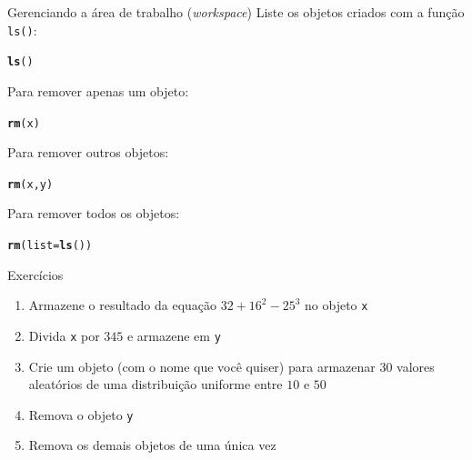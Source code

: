 \documentclass[10pt,handout]{beamer}\usepackage[]{graphicx}\usepackage[]{color}
\makeatletter
\newcommand{\hlstd}[1]{\textcolor[rgb]{0.345,0.345,0.345}{#1}}%
\newcommand{\hlkwc}[1]{\textcolor[rgb]{0.333,0.667,0.333}{#1}}%
\newcommand{\hlkwd}[1]{\textcolor[rgb]{0.282,0.239,0.545}{\textbf{#1}}}%
\newenvironment{kframe}{%
 \def\at@end@of@kframe{}%
 \ifinner\ifhmode%
  \def\at@end@of@kframe{\end{minipage}}%
  \begin{minipage}{\columnwidth}%
 \fi\fi%
 \def\FrameCommand##1{\hskip\@totalleftmargin \hskip-\fboxsep
 \colorbox{shadecolor}{##1}\hskip-\fboxsep
     \hskip-\linewidth \hskip-\@totalleftmargin \hskip\columnwidth}%
 \MakeFramed {\advance\hsize-\width
   \@totalleftmargin\z@ \linewidth\hsize
   \@setminipage}}%
 {\par\unskip\endMakeFramed%
 \at@end@of@kframe}
\newenvironment{knitrout}{}{} %
\makeatother
\begin{document}
\begin{frame}[fragile]{Gerenciando a área de trabalho (\textit{workspace})}
Liste os objetos criados com a função \texttt{ls()}:
\begin{knitrout}\small
{}\color{fgcolor}\begin{kframe}
\begin{alltt}
\hlkwd{ls}\hlstd{()}
\end{alltt}
\end{kframe}
\end{knitrout}

Para remover apenas um objeto:
\begin{knitrout}\small
{}\color{fgcolor}\begin{kframe}
\begin{alltt}
\hlkwd{rm}\hlstd{(x)}
\end{alltt}
\end{kframe}
\end{knitrout}

Para remover outros objetos:
\begin{knitrout}\small
{}\color{fgcolor}\begin{kframe}
\begin{alltt}
\hlkwd{rm}\hlstd{(x, y)}
\end{alltt}
\end{kframe}
\end{knitrout}

Para remover todos os objetos:
\begin{knitrout}\small
{}\color{fgcolor}\begin{kframe}
\begin{alltt}
\hlkwd{rm}\hlstd{(}\hlkwc{list} \hlstd{=} \hlkwd{ls}\hlstd{())}
\end{alltt}
\end{kframe}
\end{knitrout}

\end{frame}

\begin{frame}[fragile]{Exercícios}
  \begin{enumerate}
  \item Armazene o resultado da equação $32 + 16^2 - 25^3$ no objeto
    \verb|x|
  \item Divida \verb|x| por $345$ e armazene em \verb|y|
  \item Crie um objeto (com o nome que você quiser) para armazenar $30$
    valores aleatórios de uma distribuição uniforme entre $10$ e $50$
  \item Remova o objeto \verb|y|
  \item Remova os demais objetos de uma única vez
  \end{enumerate}
\end{frame}
\end{document}
